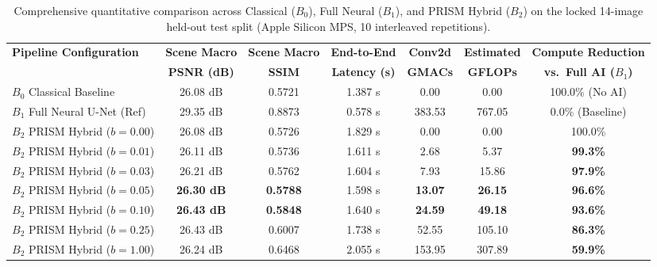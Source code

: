 \documentclass[10pt,twocolumn]{article}
\begin{document}
\begin{table}[t]
\centering
\caption{Comprehensive quantitative comparison across Classical ($B_0$), Full Neural ($B_1$), and PRISM Hybrid ($B_2$) on the locked 14-image held-out test split (Apple Silicon MPS, 10 interleaved repetitions).}
\label{tab:main_results}
\small
\begin{tabular}{lcccccc}
\toprule
\textbf{Pipeline Configuration} & \textbf{Scene Macro} & \textbf{Scene Macro} & \textbf{End-to-End} & \textbf{Conv2d} & \textbf{Estimated} & \textbf{Compute Reduction} \\
& \textbf{PSNR (dB)} & \textbf{SSIM} & \textbf{Latency (s)} & \textbf{GMACs} & \textbf{GFLOPs} & \textbf{vs.\ Full AI ($B_1$)} \\
\midrule
$B_0$ Classical Baseline & 26.08 dB & 0.5721 & 1.387 s & 0.00 & 0.00 & 100.0\% (No AI) \\
$B_1$ Full Neural U-Net (Ref) & 29.35 dB & 0.8873 & 0.578 s & 383.53 & 767.05 & 0.0\% (Baseline) \\
\midrule
$B_2$ PRISM Hybrid ($b=0.00$) & 26.08 dB & 0.5726 & 1.829 s & 0.00 & 0.00 & 100.0\% \\
$B_2$ PRISM Hybrid ($b=0.01$) & 26.11 dB & 0.5736 & 1.611 s & 2.68 & 5.37 & \textbf{99.3\%} \\
$B_2$ PRISM Hybrid ($b=0.03$) & 26.21 dB & 0.5762 & 1.604 s & 7.93 & 15.86 & \textbf{97.9\%} \\
$B_2$ PRISM Hybrid ($b=0.05$) & \textbf{26.30 dB} & \textbf{0.5788} & 1.598 s & \textbf{13.07} & \textbf{26.15} & \textbf{96.6\%} \\
$B_2$ PRISM Hybrid ($b=0.10$) & \textbf{26.43 dB} & \textbf{0.5848} & 1.640 s & \textbf{24.59} & \textbf{49.18} & \textbf{93.6\%} \\
$B_2$ PRISM Hybrid ($b=0.25$) & 26.43 dB & 0.6007 & 1.738 s & 52.55 & 105.10 & \textbf{86.3\%} \\
$B_2$ PRISM Hybrid ($b=1.00$) & 26.24 dB & 0.6468 & 2.055 s & 153.95 & 307.89 & \textbf{59.9\%} \\
\bottomrule
\end{tabular}
\end{table}
\end{document}
